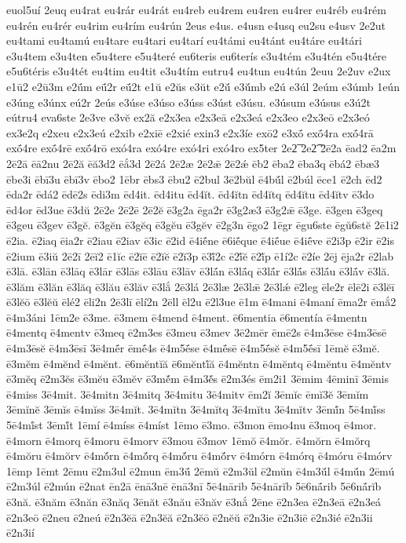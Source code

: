 {euol5uí
2euq
eu4rat
eu4rár
eu4rát
eu4reb
eu4rem
eu4ren
eu4rer
eu4réb
eu4rém
eu4rén
eu4rér
eu4rim
eu4rím
eu4rún
2eus
e4us.
e4usn
e4usq
eu2su
e4usv
2e2ut
eu4tami
eu4tamú
eu4tare
eu4tari
eu4tarí
eu4támi
eu4tánt
eu4táre
eu4tári
e3u4tem
e3u4ten
e5u4tere
e5u4teré
eu6teris
eu6terís
e3u4tém
e3u4tén
e5u4tére
e5u6téris
e3u4tét
eu4tim
eu4tit
e3u4tím
eutru4
eu4tun
eu4tún
2euu
2e2uv
e2ux
e1ū2
e2ū3m
e2ū́m
eū́2r
eū́2t
e1ŭ
e2ŭs
e3ŭt
e2ŭ́
e3ŭ́mb
e2ú
e3úl
2eúm
e3úmb
1eún
e3úng
e3únx
eú2r
2eús
e3úse
e3úso
e3úss
e3úst
e3úsu.
e3úsum
e3úsus
e3ú2t
eútru4
eva6ste
2e3ve
e3vĕ
ex2ă
e2x3ea
e2x3eā
e2x3eá
e2x3eo
e2x3eō
e2x3eó
ex3e2q
e2xeu
e2x3eú
e2xib
e2xiē
e2xié
exin3
e2x3íe
exō2
e3xṓ
exṓ4ra
exṓ4rā
exṓ4re
exṓ4rē
exṓ4rō
exó4ra
exó4re
exó4ri
exó4ro
ex5ter
2e2͞
2e2͡
2ē2a
ēad2
ēa2m
2ē2ā
ēā2nu
2ē2ă
ēă3d2
ēắ3d
2ē2á
2ē2æ
2ē2ǣ
2ē2ǽ
ēb2
ēba2
ēba3q
ēbá2
ēbæ3
ēbe3i
ēbī3u
ēbī3v
ēbo2
1ēbr
ēbs3
ēbu2
ē2bul
3ē2bŭl
ē4bŭ́l
ē2búl
ēce1
ē2ch
ēd2
ēda2r
ēdá2
ēdē2s
ēdi3m
ēd4it.
ēd4itu
ēd4ĭt.
ēd4ĭtn
ēd4ĭtq
ēd4ĭtu
ēd4ĭtv
ē3do
ēd4or
ēd3ue
ē3dŭ
2ē2e
2ē2ē
2ē2ĕ
ē3g2a
ēga2r
ē3g2æ3
ē3g2ǣ
ē3ge.
ē3gen
ē3geq
ē3geu
ē3gev
ē3gĕ.
ē3gĕn
ē3gĕq
ē3gĕu
ē3gĕv
ē2g3n
ēgo2
1ēgr
ēgu6ste
ēgŭ6stĕ
2ē1i2
ē2ia.
ē2iaq
ēia2r
ē2iau
ē2iav
ē3ic
ē2id
ē4iḗne
ē6iḗque
ē4iḗue
ē4iḗve
ē2i3p
ē2ir
ē2is
ē2ium
ē3iŭ
2ē2ī
2ēĭ2
ē1ĭc
ē2ĭē
ē2ĭĕ
ē2ĭ3p
ē3ĭ́2c
ē2ĭ́ĕ
ē2ĭ́p
ē1í2c
ē2íe
2ēj
ēja2r
ē2lab
ē3lā.
ē3lān
ē3lāq
ē3lār
ē3lās
ē3lāu
ē3lāv
ē3lā́n
ē3lā́q
ē3lā́r
ē3lā́s
ē3lā́u
ē3lā́v
ē3lă.
ē3lăm
ē3lăn
ē3lăq
ē3lău
ē3lăv
ē3lắ
2ē3lá
2ē3læ
2ē3lǣ
2ē3lǽ
ē2leg
ēle2r
ēlē2i
ē3lĕī
ē3lĕō
ē3lĕŭ
ēlé2
ēli2n
2ē3lī
ēlí2n
2ēll
ēl2u
ē2l3ue
ē1m
ē4mani
ē4maní
ēma2r
ēmắ2
ē4m3áni
1ēm2e
ē3me.
ē3mem
ē4mend
ē4ment.
ē6mentia
ē6mentía
ē4mentn
ē4mentq
ē4mentv
ē3meq
ē2m3es
ē3meu
ē3mev
3ē2mēr
ēmē2s
ē4m3ēse
ē4m3ēsē
ē4m3ēsĕ
ē4m3ēsī
3ē4mḗr
ēmḗ4s
ē4m5ḗse
ē4mḗsē
ē4m5ḗsĕ
ē4m5ḗsī
1ēmĕ
ē3mĕ.
ē3mĕm
ē4mĕnd
ē4mĕnt.
ē6mĕntĭă
ē6mĕntĭ́ă
ē4mĕntn
ē4mĕntq
ē4mĕntu
ē4mĕntv
ē3mĕq
ē2m3ĕs
ē3mĕu
ē3mĕv
ē3mĕ́m
ē4m3ĕ́s
ē2m3és
ēm2i1
3ēmim
4ēminī
3ēmis
ē4miss
3ē4mit.
3ē4mitn
3ē4mitq
3ē4mitu
3ē4mitv
ēm2ĭ
3ēmĭc
ēmĭ3ĕ
3ēmĭm
3ēmĭnĕ
3ēmĭs
ē4mĭss
3ē4mĭt.
3ē4mĭtn
3ē4mĭtq
3ē4mĭtu
3ē4mĭtv
3ēmĭ́n
5ē4mĭ́ss
5ē4mĭ́st
3ēmĭ́t
1ēmí
ē4míss
ē4míst
1ēmo
ē3mo.
ē3mon
ēmo4nu
ē3moq
ē4mor.
ē4morn
ē4morq
ē4moru
ē4morv
ē3mou
ē3mov
1ēmŏ
ē4mŏr.
ē4mŏrn
ē4mŏrq
ē4mŏru
ē4mŏrv
ē4mŏ́rn
ē4mŏ́rq
ē4mŏ́ru
ē4mŏ́rv
ē4mórn
ē4mórq
ē4móru
ē4mórv
1ēmp
1ēmt
2ēmu
ē2m3ul
ē2mun
ēm3ū́
2ēmŭ
ē2m3ŭl
ē2mŭn
ē4m3ŭ́l
ē4mŭ́n
2ēmú
ē2m3úl
ē2mún
ē2nat
ēn2ā
ēnā3nē
ēnā3nī
5ē4nārib
5ē4nārĭb
5ē6nā́rib
5ē6nā́rĭb
ē3nă.
ē3năm
ē3năn
ē3năq
3ēnăt
ē3nău
ē3năv
ē3nắ
2ēne
ē2n3ea
ē2n3eā
ē2n3eá
ē2n3eō
ē2neu
ē2neú
ē2n3ĕā
ē2n3ĕă
ē2n3ĕō
ē2nĕŭ
ē2n3ie
ē2n3iē
ē2n3ié
ē2n3ii
ē2n3ií
}
